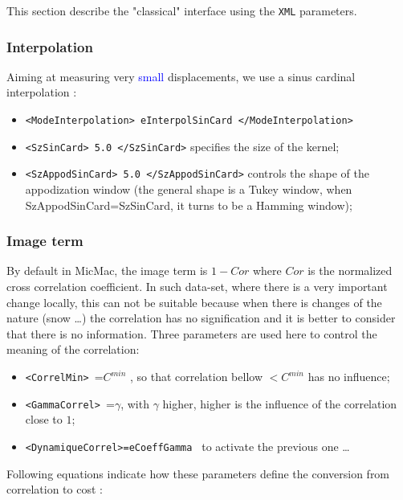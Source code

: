 This section describe the "classical" interface using the {\tt XML} parameters.

\subsubsection{Interpolation}

Aiming at measuring very \textcolor{blue}{small} displacements, we use a sinus cardinal interpolation :

\begin{itemize}
   \item {\tt <ModeInterpolation> eInterpolSinCard </ModeInterpolation>}

   \item  {\tt <SzSinCard>  5.0 </SzSinCard>} specifies the size of the kernel;

   \item  {\tt  <SzAppodSinCard>  5.0 </SzAppodSinCard>} controls the shape of the appodization
          window (the general shape is a Tukey window, when SzAppodSinCard=SzSinCard, it turns to be
          a Hamming window);
\end{itemize}


\subsubsection{Image term}

By default in MicMac, the image term is $1-Cor$ where $Cor$ is the normalized cross correlation
coefficient. In such data-set, where there is a very important change locally, this can not be
suitable because when there is changes of the nature (snow \dots)  the correlation has no
signification and it is better to consider that there is no information. %
Three parameters are used here to control the meaning of the correlation:


\begin{itemize}
   \item {\tt  <CorrelMin> }=$C^{min}$ ,
         so  that correlation bellow $<C^{min}$ has no influence;
   \item {\tt  <GammaCorrel> }=$\gamma$, with $\gamma$ higher, higher is the influence of the correlation
         close to $1$;
   \item {\tt  <DynamiqueCorrel>=eCoeffGamma } to activate the previous one \dots
\end{itemize}

Following equations indicate how these parameters define the conversion from correlation to cost :

